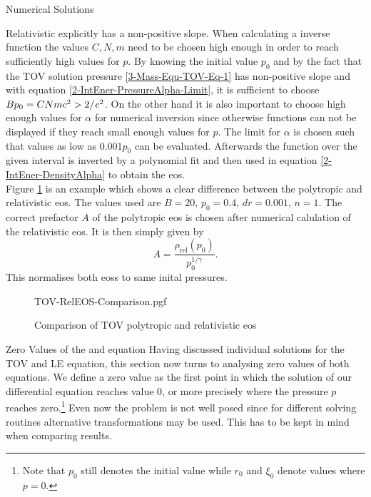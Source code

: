 \begin{section}{Numerical Solutions}
\begin{subsection}{Relativistic }
explicitly has a non-positive slope. 
When calculating a inverse function the values $C,N,m$ need to be chosen high enough in order to reach sufficiently high values for $p$.
By knowing the initial value $p_0$ and by the fact that the TOV solution pressure \eqref{3-Mass-Equ-TOV-Eq-1} has non-positive slope and with equation \eqref{2-IntEner-PressureAlpha-Limit}, it is sufficient to choose $Bp_0=CNmc^2>2/\mathit{e}^2$. 
On the other hand it is also important to choose high enough values for $\alpha$ for numerical inversion since otherwise functions can not be displayed if they reach small enough values for $p$.
The limit for $\alpha$ is chosen such that values as low as $0.001p_0$ can be evaluated.
Afterwards the function over the given interval is inverted by a polynomial fit and then used in equation \eqref{2-IntEner-DensityAlpha} to obtain the \ac{eos}.\\
Figure \ref{4-NumSol-Plt-RelEOS-TOV-Comparison} is an example which shows a clear difference between the polytropic and relativistic \ac{eos}.
The values used are $B=20$, $p_0=0.4$, $dr=0.001$, $n=1$.
The correct prefactor $A$ of the polytropic \ac{eos} is chosen after numerical calulation of the relativistic \ac{eos}.
It is then simply given by 
\begin{equation}
	A=\frac{\rho_\mathrm{rel}(p_0)}{p_0^{1/\gamma}}.
\end{equation}
This normalises both \acp{eos} to same inital pressures.
\begin{figure}
	\centering
	{TOV-RelEOS-Comparison.pgf}
	\caption[Comparison of TOV polytropic and relativistic EOS]{Comparison of TOV polytropic and relativistic \acs{eos}}
	\label{4-NumSol-Plt-RelEOS-TOV-Comparison}
\end{figure}
\end{subsection}
%
%
\begin{subsection}{Zero Values of the  and  equation}
\label{4-NumSol-Sec-TOV-Exponents}
Having discussed individual solutions for the \ac{TOV} and \ac{LE} equation, this section now turns to analysing zero values of both equations.
We define a zero value as the first point in which the solution of our differential equation reaches value $0$, or more precisely where the pressure $p$ reaches zero.\footnote{Note that $p_0$ still denotes the initial value while $r_0$ and $\xi_0$ denote values where $p=0$.}
Even now the problem is not well posed since for different solving routines alternative transformations may be used.
This has to be kept in mind when comparing results. 

\end{subsection}
\end{section}
